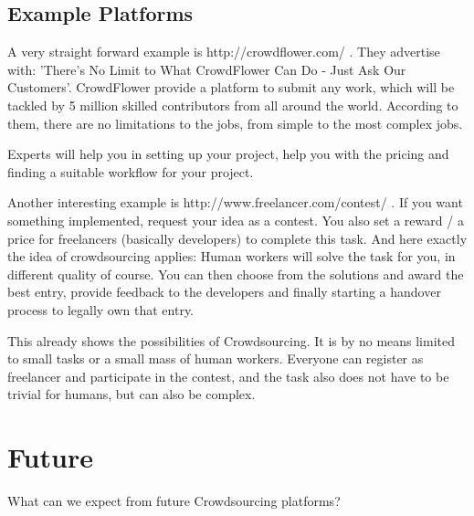 \documentclass{sig-alternate}
\begin{document}
\subsection{Example Platforms}

A very straight forward example is http://crowdflower.com/ .
They advertise with: 'There's No Limit to What CrowdFlower Can Do - Just Ask Our Customers'.
CrowdFlower provide a platform to submit any work, which will be tackled by 5 million skilled contributors from all around the world.
According to them, there are no limitations to the jobs, from simple to the most complex jobs.

Experts will help you in setting up your project, help you with the pricing and finding a suitable workflow for your project.

Another interesting example is http://www.freelancer.com/contest/ .
If you want something implemented, request your idea as a contest. You also set a reward / a price for freelancers (basically developers) to complete this task.
And here exactly the idea of crowdsourcing applies: Human workers will solve the task for you, in different quality of course. You can then choose
from the solutions and award the best entry, provide feedback to the developers and finally starting a handover process to legally own that entry.

This already shows the possibilities of Crowdsourcing. It is by no means limited to small tasks or a small mass of human workers.
Everyone can register as freelancer and participate in the contest, and the task also does not have to be trivial for humans, but can also be complex.



\section{Future}

What can we expect from future Crowdsourcing platforms?


%

\end{document}
